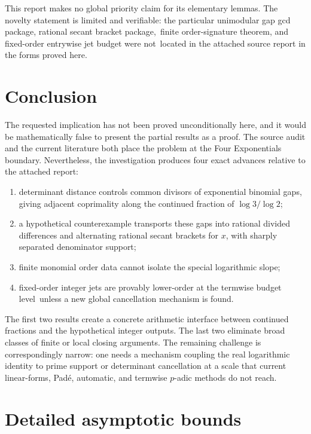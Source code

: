 \documentclass[11pt,oneside]{article}
\theoremstyle{definition}
\theoremstyle{remark}
\begin{document}
This report makes no global priority claim for its elementary lemmas.  The
novelty statement is limited and verifiable: the particular unimodular gap gcd package, rational secant bracket package,\
finite order-signature theorem, and fixed-order entrywise jet budget were not\
located in the attached source report in the forms proved here.

\section{Conclusion}

The requested implication has not been proved unconditionally here, and it
would be mathematically false to present the partial results as a proof.  The
source audit and the current literature both place the problem at the Four
Exponentials boundary.  Nevertheless, the investigation produces four exact
advances relative to the attached report:
\begin{enumerate}[label=(\arabic*)]
\item determinant distance controls common divisors of exponential binomial
  gaps, giving adjacent coprimality along the continued fraction of
  $\log3/\log2$;
\item a hypothetical counterexample transports these gaps into rational
  divided differences and alternating rational secant brackets for $x$, with
  sharply separated denominator support;
\item finite monomial order data cannot isolate the special logarithmic
  slope;
\item fixed-order integer jets are provably lower-order at the termwise budget level\
  unless a new global cancellation mechanism is found.
\end{enumerate}

The first two results create a concrete arithmetic interface between
continued fractions and the hypothetical integer outputs.  The last two
eliminate broad classes of finite or local closing arguments.  The remaining
challenge is correspondingly narrow: one needs a mechanism coupling the real
logarithmic identity to prime support or determinant cancellation at a scale
that current linear-forms, Pad\'e, automatic, and termwise $p$-adic methods do
not reach.

\appendix

\section{Detailed asymptotic bounds}
\end{document}
